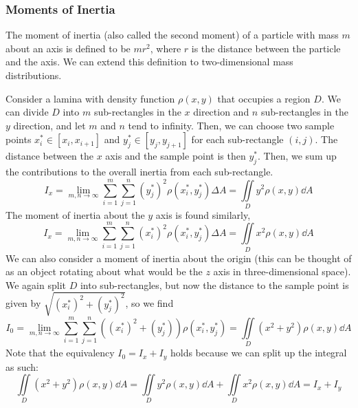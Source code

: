 \subsubsection{Moments of Inertia}
The moment of inertia (also called the second moment) of a particle with mass \( m \) about an axis is defined to be \( mr^2 \), where \( r \) is the distance between the particle and the axis. We can extend this definition to two-dimensional mass distributions. \par
Consider a lamina with density function \( \rho(x,y) \) that occupies a region \( D \). We can divide \( D \) into \( m \) sub-rectangles in the \( x \) direction and \( n \) sub-rectangles in the \( y \) direction, and let \( m \) and \( n \) tend to infinity. Then, we can choose two sample points \( x_i^*\in [x_i, x_{i+1}] \) and \( y_j^*\in [y_j, y_{j+1}] \) for each sub-rectangle \( (i, j) \). The distance between the \( x \) axis and the sample point is then \( y_j^* \). Then, we sum up the contributions to the overall inertia from each sub-rectangle.
\[ I_x = \lim_{m,n\to\infty}\sum_{i=1}^m\sum_{j=1}^n (y_j^*)^2\rho(x_i^*, y_j^*)\Delta A = \iint\limits_D y^2\rho(x,y)\dd A \]
The moment of inertia about the $y$ axis is found similarly, 
\[ I_x = \lim_{m,n\to\infty}\sum_{i=1}^m\sum_{j=1}^n (x_i^*)^2\rho(x_i^*, y_j^*)\Delta A = \iint\limits_D x^2\rho(x,y)\dd A \]
We can also consider a moment of inertia about the origin (this can be thought of as an object rotating about what would be the $z$ axis in three-dimensional space). We again split $D$ into sub-rectangles, but now the distance to the sample point is given by \( \sqrt{(x_i^*)^2+(y_j^*)^2} \), so we find
\[ I_0 =  \lim_{m,n\to\infty}\sum_{i=1}^m\sum_{j=1}^n ((x_i^*)^2+(y_j^*))\rho(x_i^*, y_j^*) = \iint\limits_D (x^2+y^2)\rho(x,y)\dd A \]
Note that the equivalency $I_0 = I_x + I_y$ holds because we can split up the integral as such:
\[ \iint\limits_D (x^2+y^2)\rho(x,y)\dd A = \iint\limits_D y^2\rho(x,y)\dd A + \iint\limits_D x^2\rho(x,y)\dd A = I_x + I_y \]
